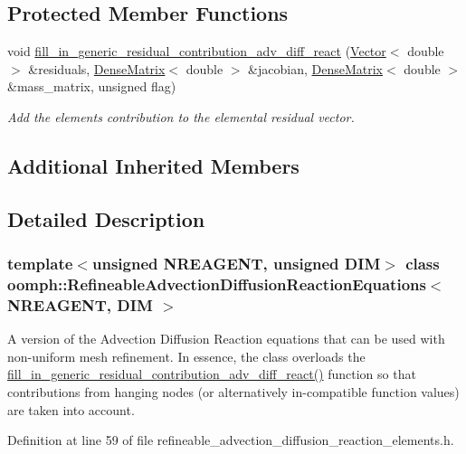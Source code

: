 \subsection*{Protected Member Functions}
\begin{DoxyCompactItemize}
\item 
void \hyperlink{classoomph_1_1RefineableAdvectionDiffusionReactionEquations_ac00be5fb705024129d006f2ed2d80eab}{fill\+\_\+in\+\_\+generic\+\_\+residual\+\_\+contribution\+\_\+adv\+\_\+diff\+\_\+react} (\hyperlink{classoomph_1_1Vector}{Vector}$<$ double $>$ \&residuals, \hyperlink{classoomph_1_1DenseMatrix}{Dense\+Matrix}$<$ double $>$ \&jacobian, \hyperlink{classoomph_1_1DenseMatrix}{Dense\+Matrix}$<$ double $>$ \&mass\+\_\+matrix, unsigned flag)
\begin{DoxyCompactList}\small\item\em Add the element\textquotesingle{}s contribution to the elemental residual vector. \end{DoxyCompactList}\end{DoxyCompactItemize}
\subsection*{Additional Inherited Members}


\subsection{Detailed Description}
\subsubsection*{template$<$unsigned N\+R\+E\+A\+G\+E\+NT, unsigned D\+IM$>$\newline
class oomph\+::\+Refineable\+Advection\+Diffusion\+Reaction\+Equations$<$ N\+R\+E\+A\+G\+E\+N\+T, D\+I\+M $>$}

A version of the Advection Diffusion Reaction equations that can be used with non-\/uniform mesh refinement. In essence, the class overloads the \hyperlink{classoomph_1_1RefineableAdvectionDiffusionReactionEquations_ac00be5fb705024129d006f2ed2d80eab}{fill\+\_\+in\+\_\+generic\+\_\+residual\+\_\+contribution\+\_\+adv\+\_\+diff\+\_\+react()} function so that contributions from hanging nodes (or alternatively in-\/compatible function values) are taken into account. 

Definition at line 59 of file refineable\+\_\+advection\+\_\+diffusion\+\_\+reaction\+\_\+elements.\+h.



